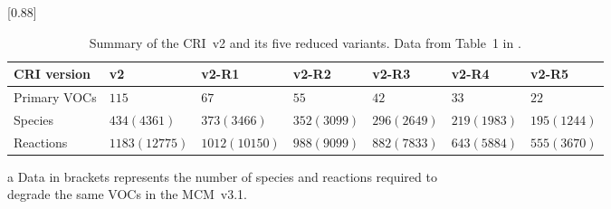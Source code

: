 \begin{table*}
    \centering
    \caption[Summary of the CRI~v2 and its five reduced variants.]{Summary of the CRI~v2 and its five reduced variants. Data from Table~1 in \citet{Watson:2008}.}
    \label{t:CRI_summary}
    \begin{threeparttable}
        \centering
        \scalebox{0.88}[0.88]{\begin{tabular}{lllllll}
                \hline \hline
                \textbf{CRI version} & \textbf{v2} & \textbf{v2-R1} & \textbf{v2-R2} & \textbf{v2-R3} & \textbf{v2-R4} & \textbf{v2-R5} \\
                \hline \hline
                Primary VOCs & $115$ & $67$ & $55$ & $42$ & $33$ & $22$ \\
                Species \tnote{a} & $434 (4361)$ & $373 (3466)$ & $352 (3099)$ & $296 (2649)$ & $219 (1983)$ & $195 (1244)$ \\
                Reactions \tnote{a} & $1183 (12775)$ & $1012 (10150)$ & $988 (9099)$ & $882 (7833)$ & $643 (5884)$ & $555 (3670)$ \\
                \hline \hline
            \end{tabular}
        }
        \begin{tablenotes}
            \item[a] Data in brackets represents the number of species and reactions required to\\degrade the same VOCs in the MCM~v3.1.
        \end{tablenotes}
    \end{threeparttable}
\end{table*}

